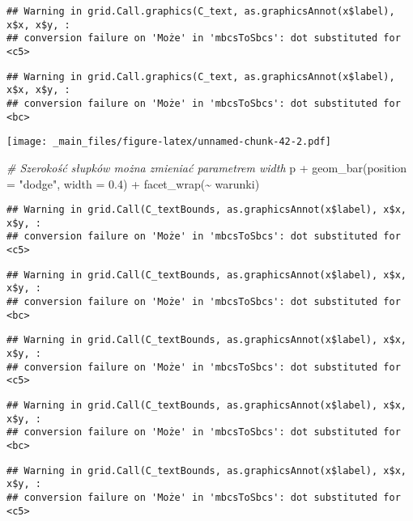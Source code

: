 \documentclass[
]{book}
\newenvironment{Shaded}{\begin{snugshade}}{\end{snugshade}}
\newcommand{\AttributeTok}[1]{\textcolor[rgb]{0.77,0.63,0.00}{#1}}
\newcommand{\CommentTok}[1]{\textcolor[rgb]{0.56,0.35,0.01}{\textit{#1}}}
\newcommand{\FloatTok}[1]{\textcolor[rgb]{0.00,0.00,0.81}{#1}}
\newcommand{\FunctionTok}[1]{\textcolor[rgb]{0.00,0.00,0.00}{#1}}
\newcommand{\NormalTok}[1]{#1}
\newcommand{\SpecialCharTok}[1]{\textcolor[rgb]{0.00,0.00,0.00}{#1}}
\newcommand{\StringTok}[1]{\textcolor[rgb]{0.31,0.60,0.02}{#1}}
\begin{document}
\begin{verbatim}
## Warning in grid.Call.graphics(C_text, as.graphicsAnnot(x$label), x$x, x$y, :
## conversion failure on 'Może' in 'mbcsToSbcs': dot substituted for <c5>
\end{verbatim}

\begin{verbatim}
## Warning in grid.Call.graphics(C_text, as.graphicsAnnot(x$label), x$x, x$y, :
## conversion failure on 'Może' in 'mbcsToSbcs': dot substituted for <bc>
\end{verbatim}

\texttt{[image: \_main\_files/figure-latex/unnamed-chunk-42-2.pdf]}

\begin{Shaded}
\begin{Highlighting}[]
\CommentTok{\# Szerokość słupków można zmieniać parametrem width}
\NormalTok{p }\SpecialCharTok{+} \FunctionTok{geom\_bar}\NormalTok{(}\AttributeTok{position =} \StringTok{"dodge"}\NormalTok{, }\AttributeTok{width =} \FloatTok{0.4}\NormalTok{) }\SpecialCharTok{+} \FunctionTok{facet\_wrap}\NormalTok{(}\SpecialCharTok{\textasciitilde{}}\NormalTok{ warunki)}
\end{Highlighting}
\end{Shaded}

\begin{verbatim}
## Warning in grid.Call(C_textBounds, as.graphicsAnnot(x$label), x$x, x$y, :
## conversion failure on 'Może' in 'mbcsToSbcs': dot substituted for <c5>
\end{verbatim}

\begin{verbatim}
## Warning in grid.Call(C_textBounds, as.graphicsAnnot(x$label), x$x, x$y, :
## conversion failure on 'Może' in 'mbcsToSbcs': dot substituted for <bc>
\end{verbatim}

\begin{verbatim}
## Warning in grid.Call(C_textBounds, as.graphicsAnnot(x$label), x$x, x$y, :
## conversion failure on 'Może' in 'mbcsToSbcs': dot substituted for <c5>
\end{verbatim}

\begin{verbatim}
## Warning in grid.Call(C_textBounds, as.graphicsAnnot(x$label), x$x, x$y, :
## conversion failure on 'Może' in 'mbcsToSbcs': dot substituted for <bc>
\end{verbatim}

\begin{verbatim}
## Warning in grid.Call(C_textBounds, as.graphicsAnnot(x$label), x$x, x$y, :
## conversion failure on 'Może' in 'mbcsToSbcs': dot substituted for <c5>
\end{verbatim}
\end{document}
